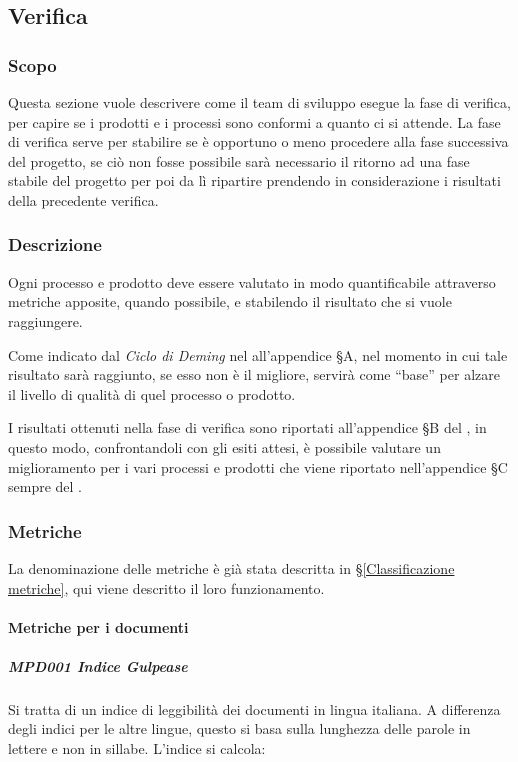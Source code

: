 	\subsection{Verifica}

		\subsubsection{Scopo}
		Questa sezione vuole descrivere come il team di sviluppo esegue la fase di verifica, per capire se i prodotti e i processi sono conformi a quanto ci si attende.
		La fase di verifica serve per stabilire se è opportuno o meno procedere alla fase successiva del progetto, se ciò non fosse possibile sarà necessario il
		ritorno ad una fase stabile del progetto per poi da lì ripartire prendendo in considerazione i risultati della precedente verifica.


		\subsubsection{Descrizione}
		Ogni processo e prodotto deve essere valutato in modo quantificabile attraverso metriche apposite, quando possibile, e stabilendo il risultato che si vuole raggiungere.

		Come indicato dal \textit{Ciclo di Deming} nel \Doc{\PdQ} all'appendice \S A, nel momento in cui tale risultato sarà raggiunto, se esso non è il migliore,
		servirà come ``base'' per alzare il livello di qualità di quel processo o prodotto.

		I risultati ottenuti nella fase di verifica sono riportati all'appendice \S B del \Doc{\PdQ}, in questo modo, confrontandoli con gli esiti attesi,
		è possibile valutare un miglioramento per i vari processi e prodotti che viene riportato nell'appendice §C sempre del \PdQ.

		\subsubsection{Metriche}
		La denominazione delle metriche è già stata descritta in \S\ref{Classificazione metriche}, qui viene descritto il loro funzionamento.
			\paragraph{Metriche per i documenti}
				\subparagraph{MPD001 Indice Gulpease}
				Si tratta di un indice di leggibilità dei documenti in lingua italiana. A differenza degli indici per le altre lingue, questo si basa sulla
				lunghezza delle parole in lettere e non in sillabe. L'indice si calcola:


